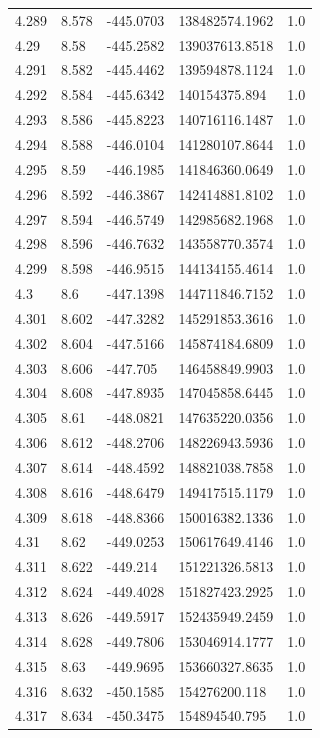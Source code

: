 \begin{tabular}{lllll}
4.289 & 8.578 & -445.0703 & 138482574.1962 & 1.0 \\
4.29 & 8.58 & -445.2582 & 139037613.8518 & 1.0 \\
4.291 & 8.582 & -445.4462 & 139594878.1124 & 1.0 \\
4.292 & 8.584 & -445.6342 & 140154375.894 & 1.0 \\
4.293 & 8.586 & -445.8223 & 140716116.1487 & 1.0 \\
4.294 & 8.588 & -446.0104 & 141280107.8644 & 1.0 \\
4.295 & 8.59 & -446.1985 & 141846360.0649 & 1.0 \\
4.296 & 8.592 & -446.3867 & 142414881.8102 & 1.0 \\
4.297 & 8.594 & -446.5749 & 142985682.1968 & 1.0 \\
4.298 & 8.596 & -446.7632 & 143558770.3574 & 1.0 \\
4.299 & 8.598 & -446.9515 & 144134155.4614 & 1.0 \\
4.3 & 8.6 & -447.1398 & 144711846.7152 & 1.0 \\
4.301 & 8.602 & -447.3282 & 145291853.3616 & 1.0 \\
4.302 & 8.604 & -447.5166 & 145874184.6809 & 1.0 \\
4.303 & 8.606 & -447.705 & 146458849.9903 & 1.0 \\
4.304 & 8.608 & -447.8935 & 147045858.6445 & 1.0 \\
4.305 & 8.61 & -448.0821 & 147635220.0356 & 1.0 \\
4.306 & 8.612 & -448.2706 & 148226943.5936 & 1.0 \\
4.307 & 8.614 & -448.4592 & 148821038.7858 & 1.0 \\
4.308 & 8.616 & -448.6479 & 149417515.1179 & 1.0 \\
4.309 & 8.618 & -448.8366 & 150016382.1336 & 1.0 \\
4.31 & 8.62 & -449.0253 & 150617649.4146 & 1.0 \\
4.311 & 8.622 & -449.214 & 151221326.5813 & 1.0 \\
4.312 & 8.624 & -449.4028 & 151827423.2925 & 1.0 \\
4.313 & 8.626 & -449.5917 & 152435949.2459 & 1.0 \\
4.314 & 8.628 & -449.7806 & 153046914.1777 & 1.0 \\
4.315 & 8.63 & -449.9695 & 153660327.8635 & 1.0 \\
4.316 & 8.632 & -450.1585 & 154276200.118 & 1.0 \\
4.317 & 8.634 & -450.3475 & 154894540.795 & 1.0 \\

\end{tabular}
